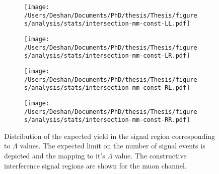 \begin{figure}[h!]
    \centering
    \begin{subfigure}[b]{0.49\textwidth}
        \centering
        \texttt{[image: /Users/Deshan/Documents/PhD/thesis/Thesis/figures/analysis/stats/intersection-mm-const-LL.pdf]}
        \label{fig:bkgmodel:interpmm1}
    \end{subfigure}
    \begin{subfigure}[b]{0.49\textwidth}
        \centering
        \texttt{[image: /Users/Deshan/Documents/PhD/thesis/Thesis/figures/analysis/stats/intersection-mm-const-LR.pdf]}
        \label{fig:bkgmodel:interpmm2}
    \end{subfigure}
    \begin{subfigure}[b]{0.49\textwidth}
        \centering
        \texttt{[image: /Users/Deshan/Documents/PhD/thesis/Thesis/figures/analysis/stats/intersection-mm-const-RL.pdf]}
        \label{fig:bkgmodel:interpmm3}
    \end{subfigure}
    \begin{subfigure}[b]{0.49\textwidth}
        \centering
        \texttt{[image: /Users/Deshan/Documents/PhD/thesis/Thesis/figures/analysis/stats/intersection-mm-const-RR.pdf]}
        \label{fig:bkgmodel:interpmm4}
    \end{subfigure}
    \caption{Distribution of the expected yield in the signal region corresponding to $\Lambda$ values. The expected limit on the number of signal events is depicted and the mapping to it's $\Lambda$ value. The constructive interference signal regions are shown for the muon channel.}
    \label{fig:stats:interpmmconst}
\end{figure}

